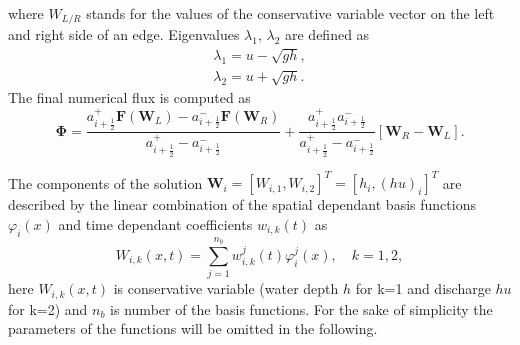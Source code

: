 where $W_{L/R}$ stands for the values of the conservative variable vector on the left and right side of an edge. Eigenvalues $\lambda_1$, $\lambda_2$ are defined as
\begin{equation}
\begin{array}{c}
\lambda_1=u-\sqrt{gh},\\
\lambda_2=u+\sqrt{gh}.
\end{array}
\end{equation}
The final numerical flux is computed as
\begin{equation}\label{Phi}
\mathbf{\Phi}=\frac{a_{i+\frac12}^+\mathbf{F}\left(\mathbf{W}_L\right)-a_{i+\frac12}^-\mathbf{F}\left(\mathbf{W}_R\right)}{a_{i+\frac12}^+-a_{i+\frac12}^-}+\frac{a^+_{i+\frac12}a^-_{i+\frac12}}{a^+_{i+\frac12}-a^-_{i+\frac12}}\left[\mathbf{W}_R-\mathbf{W}_L\right].
\end{equation}

The components of the solution $\mathbf{W}_i=[W_{i,1},W_{i,2}]^T=[h_i,(hu)_i]^T$ are described by the linear combination of the spatial dependant basis functions $\varphi_i(x)$ and time dependant coefficients $w_{i,k}(t)$ as
\begin{equation}\label{linC}
W_{i,k}(x,t)=\sum_{j=1}^{n_b} w_{i,k}^j(t) \varphi_{i}^j(x), \quad k=1,2,
\end{equation}
here $W_{i,k}(x,t)$ is conservative variable (water depth $h$ for k=1 and discharge $hu$ for k=2) and $n_b$ is number of the basis functions.
For the sake of simplicity the parameters of the functions will be omitted in the following.

